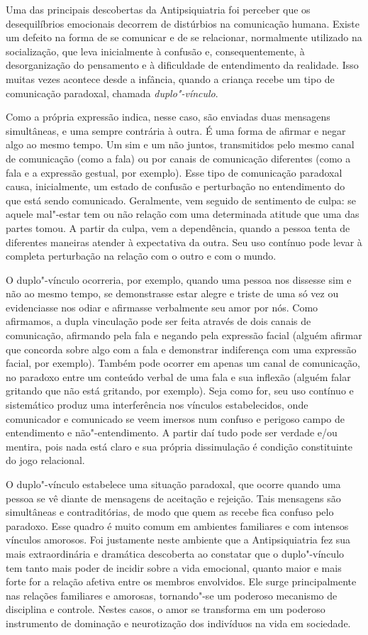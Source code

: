 Uma das principais descobertas da Antipsiquiatria foi perceber que os
desequilíbrios emocionais decorrem de distúrbios na comunicação humana.
Existe um defeito na forma de se comunicar e de se relacionar,
normalmente utilizado na socialização, que leva inicialmente à confusão
e, consequentemente, à desorganização do pensamento e à dificuldade de
entendimento da realidade. Isso muitas vezes acontece desde a infância,
quando a criança recebe um tipo de comunicação paradoxal, chamada
\emph{duplo"-vínculo}.

Como a própria expressão indica, nesse caso, são enviadas duas mensagens
simultâneas, e uma sempre contrária à outra. É uma forma de afirmar e
negar algo ao mesmo tempo. Um sim e um não juntos, transmitidos pelo
mesmo canal de comunicação (como a fala) ou por canais de comunicação
diferentes (como a fala e a expressão gestual, por exemplo). Esse tipo
de comunicação paradoxal causa, inicialmente, um estado de confusão e
perturbação no entendimento do que está sendo comunicado. Geralmente,
vem seguido de sentimento de culpa: se aquele mal"-estar tem ou não
relação com uma determinada atitude que uma das partes tomou. A partir
da culpa, vem a dependência, quando a pessoa tenta de diferentes
maneiras atender à expectativa da outra. Seu uso contínuo pode levar à
completa perturbação na relação com o outro e com o mundo.

O duplo"-vínculo ocorreria, por exemplo, quando uma pessoa nos dissesse
sim e não ao mesmo tempo, se demonstrasse estar alegre e triste de uma
só vez ou evidenciasse nos odiar e afirmasse verbalmente seu amor por
nós. Como afirmamos, a dupla vinculação pode ser feita através de dois
canais de comunicação, afirmando pela fala e negando pela expressão
facial (alguém afirmar que concorda sobre algo com a fala e demonstrar
indiferença com uma expressão facial, por exemplo). Também pode ocorrer
em apenas um canal de comunicação, no paradoxo entre um conteúdo verbal
de uma fala e sua inflexão (alguém falar gritando que não está gritando,
por exemplo). Seja como for, seu uso contínuo e sistemático produz uma
interferência nos vínculos estabelecidos, onde comunicador e comunicado
se veem imersos num confuso e perigoso campo de entendimento e
não"-entendimento. A partir daí tudo pode ser verdade e/ou mentira, pois
nada está claro e sua própria dissimulação é condição constituinte do
jogo relacional.

O duplo"-vínculo estabelece uma situação paradoxal, que ocorre quando uma
pessoa se vê diante de mensagens de aceitação e rejeição. Tais mensagens
são simultâneas e contraditórias, de modo que quem as recebe fica
confuso pelo paradoxo. Esse quadro é muito comum em ambientes familiares
e com intensos vínculos amorosos. Foi justamente neste ambiente que a
Antipsiquiatria fez sua mais extraordinária e dramática descoberta ao
constatar que o duplo"-vínculo tem tanto mais poder de incidir sobre a
vida emocional, quanto maior e mais forte for a relação afetiva entre os
membros envolvidos. Ele surge principalmente nas relações familiares e
amorosas, tornando"-se um poderoso mecanismo de disciplina e controle.
Nestes casos, o amor se transforma em um poderoso instrumento de
dominação e neurotização dos indivíduos na vida em sociedade.


